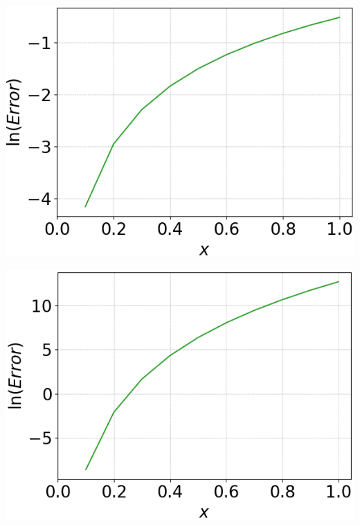 \documentclass[12pt, a4paper]{article}
\begin{document}
\begin{minipage}{0.45\textwidth}
	\centering
	\includegraphics[width=\linewidth]{q4_series_order=1}
	\label{q4_series_o1}
\end{minipage}
\hspace{0.9cm}
\begin{minipage}{0.45\textwidth}
	\centering
	\includegraphics[width=\linewidth]{q4_series_order=9}
	\label{q4_series_o2}
\end{minipage}
\vspace{0.5cm}
\end{document}
